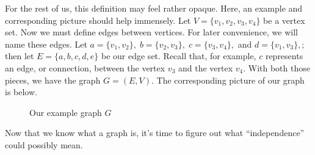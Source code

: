 \documentclass[12pt,oneside]{../../sfsuthesis}
\begin{document}
For the rest of us, this definition may feel rather opaque.
Here, an example and corresponding picture should help immensely.
Let \( V = \{ v_1, v_2, v_3, v_4 \} \) be a vertex set.
Now we must define edges between vertices.
For later convenience, we will name these edges.
Let \( a = \{ v_1, v_2 \}, \; b = \{v_2,v_3\},\; c = \{ v_3, v_4 \},\) and \( d = \{ v_1, v_3 \}, \);
then let \( E = \{ a, b, c, d, e \} \) be our edge set.
Recall that, for example,  \( c \) represents an edge, or connection, between the vertex \( v_3 \) and the vertex \( v_4 \).
With both those pieces, we have the graph \( G = (E, V) \).
The corresponding picture of our graph is below.

\begin{figure}[H]\label{fig:simpleGraph}
    \centering

    \caption{Our example graph \( G \)}

\end{figure}

Now that we know what a graph is, it's time to figure out what ``independence'' could possibly mean.
\end{document}
